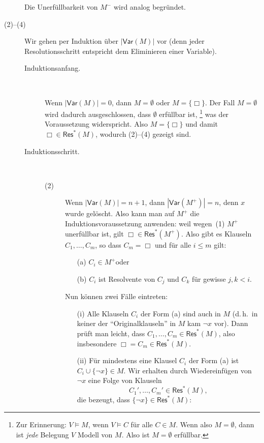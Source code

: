 \documentclass[fontsize=11pt, twoside=false, numbers=autoenddot]{scrbook}
\begin{document}
\begin{beweis}
\begin{description}
      Die Unerfüllbarkeit von $M^-$ wird analog begründet.
    \item[(2)--(4)]
      Wir gehen per Induktion über $|\textsf{Var}(M)|$ vor
      (denn jeder Resolutionsschritt entspricht dem Eliminieren einer Variable).
      \begin{description}
        \item[Induktionsanfang.]
          ~\par
          Wenn $|\textsf{Var}(M)| = 0$, dann $M = \emptyset$ oder $M = \{\Box\}$.
          Der Fall $M = \emptyset$ wird dadurch ausgeschlossen, dass $\emptyset$ erfüllbar ist,%
          \footnote{%
            Zur Erinnerung: $V \models M$, wenn $V \models C$ für alle $C \in M$.
            Wenn also $M = \emptyset$, dann ist \emph{jede} Belegung $V$ Modell von $M$.
            Also ist $M = \emptyset$ erfüllbar.%
          }
          was der Voraussetzung widerspricht.
          Also $M = \{\Box\}$ und damit $\Box \in \textsf{Res}^*(M)$,
          wodurch (2)--(4) gezeigt sind.
        \item[Induktionsschritt.]
          ~\par
          \begin{description}
            \item[(2)]
              Wenn $|\textsf{Var}(M)| = n+1$, dann $|\textsf{Var}(M^+)| = n$,
              denn $x$ wurde gelöscht.
              Also kann man auf $M^+$ die Induktionsvoraussetzung anwenden:
              weil wegen~(1) $M^+$ unerfüllbar ist,
              gilt $\Box \in \textsf{Res}^*(M^+)$.
              Also gibt es Klauseln $C_1,\dots,C_m$, so dass $C_m = \Box$ 
              und für alle $i \leq m$ gilt:
              \begin{enumerate}
                \item[(a)]
                  $C_i \in M^+$\quad oder
                \item[(b)]
                  $C_i$ ist Resolvente von $C_j$ und $C_k$ für gewisse $j,k < i$.
              \end{enumerate}
              Nun können zwei Fälle eintreten:
              \begin{enumerate}
                \item[(i)]
                  Alle Klauseln $C_i$ der Form (a) sind auch in $M$
                  (d.\,h.\ in keiner der "`Originalklauseln"' in $M$ kam $\lnot x$ vor).
                  Dann prüft man leicht, dass $C_1, \dots, C_m \in \textsf{Res}^*(M)$,
                  also insbesondere $\Box = C_m \in \textsf{Res}^*(M)$.
                \item[(ii)]
                  Für mindestens eine Klausel $C_i$ der Form (a) ist $C_i \cup \{\lnot x\} \in M$.
                  Wir erhalten durch Wiedereinfügen von $\lnot x$ eine Folge von Klauseln
                  \[
                    C_1',\dots,C_m' \in \textsf{Res}^*(M),
                  \]
                  die bezeugt, dass $\{\lnot x\} \in \textsf{Res}^*(M)$:
        

\end{enumerate}
\end{description}
\end{description}
\end{description}
\end{beweis}
\end{document}
